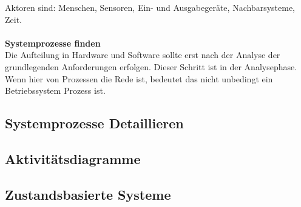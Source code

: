 Aktoren sind: Menschen, Sensoren, Ein- und Ausgabegeräte, Nachbarsysteme, Zeit.\\ \\

\textbf{Systemprozesse finden}\\
Die Aufteilung in Hardware und Software sollte erst nach der Analyse der grundlegenden Anforderungen erfolgen.
Dieser Schritt ist in der Analysephase. Wenn hier von Prozessen die Rede ist, bedeutet das nicht unbedingt ein
Betriebssystem Prozess ist.








\subsection{Systemprozesse Detaillieren}

\subsection{Aktivitätsdiagramme}

\subsection{Zustandsbasierte Systeme}